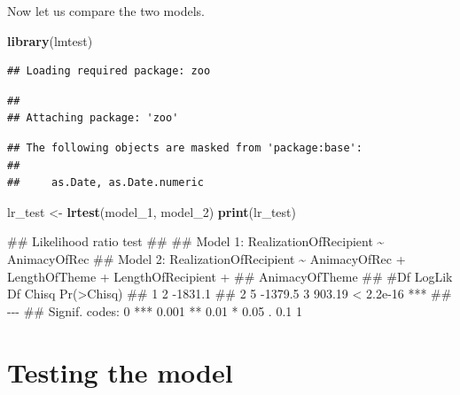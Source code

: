 \documentclass[
]{book}
\newenvironment{Shaded}{\begin{snugshade}}{\end{snugshade}}
\newcommand{\FunctionTok}[1]{\textcolor[rgb]{0.13,0.29,0.53}{\textbf{#1}}}
\newcommand{\NormalTok}[1]{#1}
\newcommand{\OtherTok}[1]{\textcolor[rgb]{0.56,0.35,0.01}{#1}}
\begin{document}
Now let us compare the two models.

\begin{Shaded}
\begin{Highlighting}[]
\FunctionTok{library}\NormalTok{(lmtest)}
\end{Highlighting}
\end{Shaded}

\begin{verbatim}
## Loading required package: zoo
\end{verbatim}

\begin{verbatim}
## 
## Attaching package: 'zoo'
\end{verbatim}

\begin{verbatim}
## The following objects are masked from 'package:base':
## 
##     as.Date, as.Date.numeric
\end{verbatim}

\begin{Shaded}
\begin{Highlighting}[]
\NormalTok{lr\_test }\OtherTok{\textless{}{-}} \FunctionTok{lrtest}\NormalTok{(model\_1, model\_2)}
\FunctionTok{print}\NormalTok{(lr\_test)}
\end{Highlighting}
\end{Shaded}

\begin{Shaded}
\begin{Highlighting}[]
\NormalTok{\#\# Likelihood ratio test}
\NormalTok{\#\# }
\NormalTok{\#\# Model 1: RealizationOfRecipient \textasciitilde{} AnimacyOfRec}
\NormalTok{\#\# Model 2: RealizationOfRecipient \textasciitilde{} AnimacyOfRec + LengthOfTheme + LengthOfRecipient + }
\NormalTok{\#\#     AnimacyOfTheme}
\NormalTok{\#\#   \#Df  LogLik Df  Chisq Pr(\textgreater{}Chisq)    }
\NormalTok{\#\# 1   2 {-}1831.1                         }
\NormalTok{\#\# 2   5 {-}1379.5  3 903.19  \textless{} 2.2e{-}16 ***}
\NormalTok{\#\# {-}{-}{-}}
\NormalTok{\#\# Signif. codes:  0 \textquotesingle{}***\textquotesingle{} 0.001 \textquotesingle{}**\textquotesingle{} 0.01 \textquotesingle{}*\textquotesingle{} 0.05 \textquotesingle{}.\textquotesingle{} 0.1 \textquotesingle{} \textquotesingle{} 1}
\end{Highlighting}
\end{Shaded}

\section{Testing the model}\label{testing-the-model}
\end{document}
